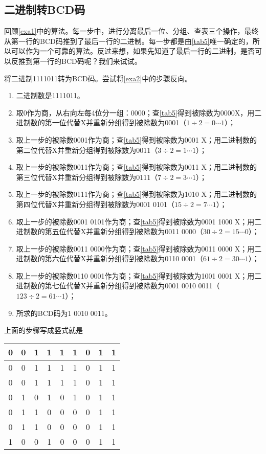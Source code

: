 \subsection{二进制转BCD码}\label{sec31}
回顾\autoref{exa1}中的算法。每一步中，进行分离最后一位、分组、查表三个操作，最终从第一行的BCD码推到了最后一行的二进制。每一步都是由\autoref{tab5}唯一确定的，所以可以作为一个可靠的算法。反过来想，如果先知道了最后一行的二进制，是否可以反推到第一行的BCD码呢？我们来试试。
\begin{example}
将二进制1111011转为BCD码。尝试将\autoref{exa2}中的步骤反向。
\begin{enumerate}
\item 二进制数是1111011。
\item 取0作为商，从右向左每4位分一组：0000；查\autoref{tab5}得到被除数为0000X，用二进制数的第一位代替X并重新分组得到被除数为0001（$1\div 2=0\cdots 1$）；
\item 取上一步的被除数0001作为商；查\autoref{tab5}得到被除数为0001 X；用二进制数的第二位代替X并重新分组得到被除数为0011（$3\div 2=1\cdots 1$）；
\item 取上一步的被除数0011作为商；查\autoref{tab5}得到被除数为0011 X；用二进制数的第三位代替X并重新分组得到被除数为0111（$7\div 2=3\cdots 1$）；
\item 取上一步的被除数0111作为商；查\autoref{tab5}得到被除数为1010 X；用二进制数的第四位代替X并重新分组得到被除数为0001 0101（$15\div 2=7\cdots 1$）；
\item 取上一步的被除数0001 0101作为商；查\autoref{tab5}得到被除数为0001 1000 X；用二进制数的第五位代替X并重新分组得到被除数为0011 0000（$30\div 2=15\cdots 0$）；
\item 取上一步的被除数0011 0000作为商；查\autoref{tab5}得到被除数为0011 0000 X；用二进制数的第六位代替X并重新分组得到被除数为0110 0001（$61\div 2=30\cdots 1$）；
\item 取上一步的被除数0110 0001作为商；查\autoref{tab5}得到被除数为1001 0001 X；用二进制数的第七位代替X并重新分组得到被除数为0001 0010 0011（$123\div 2=61\cdots 1$）；
\item 所求的BCD码为1 0010 0011。
\end{enumerate}
上面的步骤写成竖式就是
\begin{center}
\begin{tabular}{|ccccccccc|}
\hline
0&0&1&\multicolumn{1}{|c}{1}&1&1&0&1&1\\\hline
0&0&1&1&\multicolumn{1}{|c}{1}&1&0&1&1\\\hline
0&0&1&1&1&\multicolumn{1}{|c}{1}&0&1&1\\\hline
0&1&\multicolumn{1}{|c}{0}&1&0&1&\multicolumn{1}{|c}{0}&1&1\\\hline
0&1&1&\multicolumn{1}{|c}{0}&0&0&0&\multicolumn{1}{|c}{1}&1\\\hline
0&1&1&0&\multicolumn{1}{|c}{0}&0&0&1&\multicolumn{1}{|c|}{1}\\\hline
1&\multicolumn{1}{|c}{0}&0&1&0&\multicolumn{1}{|c}{0}&0&1&1\\\hline
\end{tabular}
\end{center}
\end{example}

